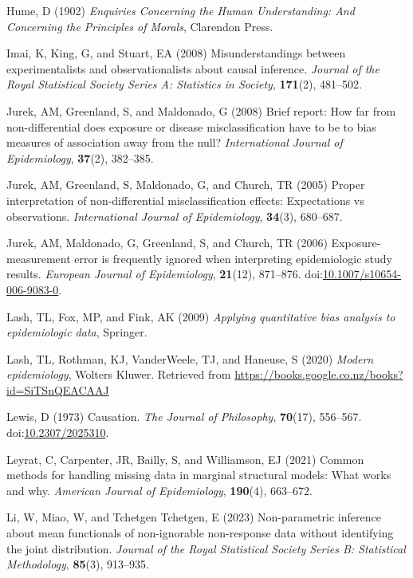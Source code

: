 \documentclass[
  single column]{article}
\newlength{\cslhangindent}
\newenvironment{CSLReferences}[2] %
 {\begin{list}{}{%
  \setlength{\itemindent}{0pt}
  \setlength{\leftmargin}{0pt}
  \setlength{\parsep}{0pt}
  \ifodd #1
   \setlength{\leftmargin}{\cslhangindent}
   \setlength{\itemindent}{-1\cslhangindent}
  \fi
  \setlength{\itemsep}{#2\baselineskip}}}
 {\end{list}}
\begin{document}
\begin{CSLReferences}{1}{0}
Hume, D (1902) \emph{Enquiries Concerning the Human Understanding: And
Concerning the Principles of Morals}, Clarendon Press.

Imai, K, King, G, and Stuart, EA (2008) Misunderstandings between
experimentalists and observationalists about causal inference.
\emph{Journal of the Royal Statistical Society Series A: Statistics in
Society}, \textbf{171}(2), 481--502.

Jurek, AM, Greenland, S, and Maldonado, G (2008) Brief report: How far
from non-differential does exposure or disease misclassification have to
be to bias measures of association away from the null?
\emph{International Journal of Epidemiology}, \textbf{37}(2), 382--385.

Jurek, AM, Greenland, S, Maldonado, G, and Church, TR (2005) Proper
interpretation of non-differential misclassification effects:
Expectations vs observations. \emph{International Journal of
Epidemiology}, \textbf{34}(3), 680--687.

Jurek, AM, Maldonado, G, Greenland, S, and Church, TR (2006)
Exposure-measurement error is frequently ignored when interpreting
epidemiologic study results. \emph{European Journal of Epidemiology},
\textbf{21}(12), 871--876.
doi:\href{https://doi.org/10.1007/s10654-006-9083-0}{10.1007/s10654-006-9083-0}.

Lash, TL, Fox, MP, and Fink, AK (2009) \emph{Applying quantitative bias
analysis to epidemiologic data}, Springer.

Lash, TL, Rothman, KJ, VanderWeele, TJ, and Haneuse, S (2020)
\emph{Modern epidemiology}, Wolters Kluwer. Retrieved from
\url{https://books.google.co.nz/books?id=SiTSnQEACAAJ}

Lewis, D (1973) Causation. \emph{The Journal of Philosophy},
\textbf{70}(17), 556--567.
doi:\href{https://doi.org/10.2307/2025310}{10.2307/2025310}.

Leyrat, C, Carpenter, JR, Bailly, S, and Williamson, EJ (2021) Common
methods for handling missing data in marginal structural models: What
works and why. \emph{American Journal of Epidemiology}, \textbf{190}(4),
663--672.

Li, W, Miao, W, and Tchetgen Tchetgen, E (2023) Non-parametric inference
about mean functionals of non-ignorable non-response data without
identifying the joint distribution. \emph{Journal of the Royal
Statistical Society Series B: Statistical Methodology}, \textbf{85}(3),
913--935.


\end{CSLReferences}
\end{document}
